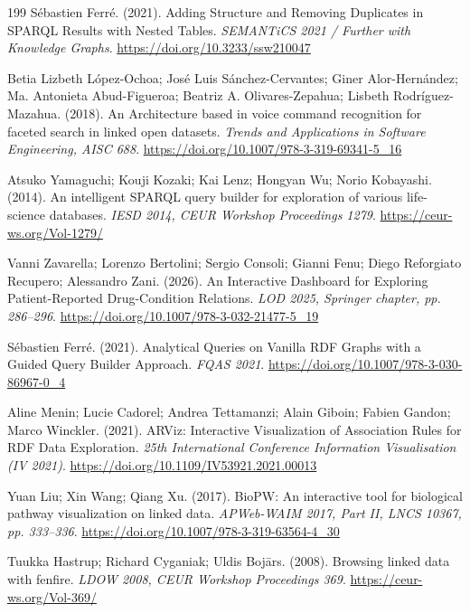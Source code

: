 \documentclass[manuscript,review,screen]{acmart}
\begin{document}
\begin{thebibliography}{199}
 S\'{e}bastien Ferr\'{e}. (2021). Adding Structure and Removing Duplicates in SPARQL Results with Nested Tables. \textit{SEMANTiCS 2021 / Further with Knowledge Graphs}. \url{https://doi.org/10.3233/ssw210047}

 Betia Lizbeth L\'{o}pez-Ochoa; Jos\'{e} Luis S\'{a}nchez-Cervantes; Giner Alor-Hern\'{a}ndez; Ma. Antonieta Abud-Figueroa; Beatriz A. Olivares-Zepahua; Lisbeth Rodr\'{i}guez-Mazahua. (2018). An Architecture based in voice command recognition for faceted search in linked open datasets. \textit{Trends and Applications in Software Engineering, AISC 688}. \url{https://doi.org/10.1007/978-3-319-69341-5_16}

 Atsuko Yamaguchi; Kouji Kozaki; Kai Lenz; Hongyan Wu; Norio Kobayashi. (2014). An intelligent SPARQL query builder for exploration of various life-science databases. \textit{IESD 2014, CEUR Workshop Proceedings 1279}. \url{https://ceur-ws.org/Vol-1279/}

 Vanni Zavarella; Lorenzo Bertolini; Sergio Consoli; Gianni Fenu; Diego Reforgiato Recupero; Alessandro Zani. (2026). An Interactive Dashboard for Exploring Patient-Reported Drug-Condition Relations. \textit{LOD 2025, Springer chapter, pp. 286--296}. \url{https://doi.org/10.1007/978-3-032-21477-5_19}

 S\'{e}bastien Ferr\'{e}. (2021). Analytical Queries on Vanilla RDF Graphs with a Guided Query Builder Approach. \textit{FQAS 2021}. \url{https://doi.org/10.1007/978-3-030-86967-0_4}

 Aline Menin; Lucie Cadorel; Andrea Tettamanzi; Alain Giboin; Fabien Gandon; Marco Winckler. (2021). ARViz: Interactive Visualization of Association Rules for RDF Data Exploration. \textit{25th International Conference Information Visualisation (IV 2021)}. \url{https://doi.org/10.1109/IV53921.2021.00013}

 Yuan Liu; Xin Wang; Qiang Xu. (2017). BioPW: An interactive tool for biological pathway visualization on linked data. \textit{APWeb-WAIM 2017, Part II, LNCS 10367, pp. 333--336}. \url{https://doi.org/10.1007/978-3-319-63564-4_30}

 Tuukka Hastrup; Richard Cyganiak; Uldis Boj\={a}rs. (2008). Browsing linked data with fenfire. \textit{LDOW 2008, CEUR Workshop Proceedings 369}. \url{https://ceur-ws.org/Vol-369/}


\end{thebibliography}
\end{document}
